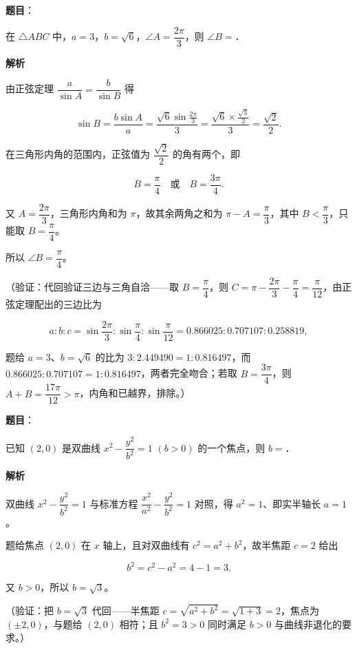 \begin{answer}

\textbf{题目}：

在 \(\triangle ABC\) 中，\(a=3\)，\(b=\sqrt{6}\)，\(\angle A=\dfrac{2\pi}{3}\)，则 \(\angle B=\)\gkblank{}．

\textbf{解析}

由正弦定理 \(\dfrac{a}{\sin A}=\dfrac{b}{\sin B}\) 得

\nopagebreak[4]
\[
\sin B=\frac{b\sin A}{a}=\frac{\sqrt{6}\sin\frac{2\pi}{3}}{3}=\frac{\sqrt{6}\times\frac{\sqrt{3}}{2}}{3}=\frac{\sqrt{2}}{2}.
\]

在三角形内角的范围内，正弦值为 \(\dfrac{\sqrt{2}}{2}\) 的角有两个，即

\nopagebreak[4]
\[
B=\frac{\pi}{4}\quad\text{或}\quad B=\frac{3\pi}{4}.
\]

又 \(A=\dfrac{2\pi}{3}\)，三角形内角和为 \(\pi\)，故其余两角之和为 \(\pi-A=\dfrac{\pi}{3}\)，其中 \(B<\dfrac{\pi}{3}\)，只能取 \(B=\dfrac{\pi}{4}\)。

所以 \(\angle B=\dfrac{\pi}{4}\)。

（验证：代回验证三边与三角自洽——取 \(B=\dfrac{\pi}{4}\)，则 \(C=\pi-\dfrac{2\pi}{3}-\dfrac{\pi}{4}=\dfrac{\pi}{12}\)，由正弦定理配出的三边比为

\nopagebreak[4]
\[
a:b:c=\sin\frac{2\pi}{3}:\sin\frac{\pi}{4}:\sin\frac{\pi}{12}=0.866025:0.707107:0.258819,
\]

题给 \(a=3\)、\(b=\sqrt{6}\) 的比为 \(3:2.449490=1:0.816497\)，而 \(0.866025:0.707107=1:0.816497\)，两者完全吻合；若取 \(B=\dfrac{3\pi}{4}\)，则 \(A+B=\dfrac{17\pi}{12}>\pi\)，内角和已越界，排除。）


\end{answer}
\begin{answer}

\textbf{题目}：

已知 \((2,0)\) 是双曲线 \(x^{2}-\dfrac{y^{2}}{b^{2}}=1\) \((b>0)\) 的一个焦点，则 \(b=\)\gkblank{}．

\textbf{解析}

双曲线 \(x^{2}-\dfrac{y^{2}}{b^{2}}=1\) 与标准方程 \(\dfrac{x^{2}}{a^{2}}-\dfrac{y^{2}}{b^{2}}=1\) 对照，得 \(a^{2}=1\)、即实半轴长 \(a=1\)。

题给焦点 \((2,0)\) 在 \(x\) 轴上，且对双曲线有 \(c^{2}=a^{2}+b^{2}\)，故半焦距 \(c=2\) 给出

\nopagebreak[4]
\[
b^{2}=c^{2}-a^{2}=4-1=3.
\]

又 \(b>0\)，所以 \(b=\sqrt{3}\)。

（验证：把 \(b=\sqrt{3}\) 代回——半焦距 \(c=\sqrt{a^{2}+b^{2}}=\sqrt{1+3}=2\)，焦点为 \((\pm2,0)\)，与题给 \((2,0)\) 相符；且 \(b^{2}=3>0\) 同时满足 \(b>0\) 与曲线非退化的要求。）


\end{answer}
